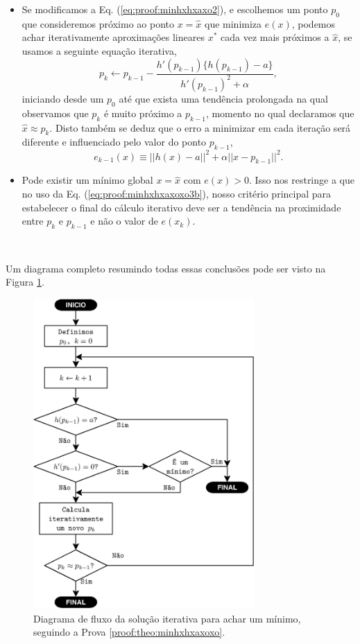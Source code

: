 \begin{myproofT}
\begin{itemize}
\item Se modificamos a Eq. (\ref{eq:proof:minhxhxaxo2}), e escolhemos um ponto  
$p_0$ que consideremos próximo ao ponto $x=\hat{x}$ que minimiza $e(x)$,
podemos achar iterativamente aproximações lineares $x^*$ cada vez mais próximos a  $\hat{x}$,
se usamos a seguinte equação iterativa,
\begin{equation}\label{eq:proof:minhxhxaxoxo3b}
p_{k} \leftarrow p_{k-1} - \frac{h'(p_{k-1})\{h(p_{k-1})-a\}}{h'(p_{k-1})^2 +\alpha},
\end{equation}
iniciando desde um $p_{0}$ 
até que exista uma tendência prolongada na qual observamos que $p_{k}$ é muito próximo a $p_{k-1}$,
momento no qual declaramos que $\hat{x} \approx p_{k}$.
Disto também se deduz que o erro a minimizar em cada iteração será diferente e influenciado pelo valor do ponto $p_{k-1}$,
\begin{equation}
e_{k-1}(x)  \equiv ||h(x)-a||^2+\alpha||x-p_{k-1}||^2.
\end{equation}
\item Pode existir um mínimo global $x=\hat{x}$ com $e(x) > 0$.
Isso nos restringe a que no uso da Eq. (\ref{eq:proof:minhxhxaxoxo3b}),
nosso critério principal para estabelecer o final do cálculo iterativo
deve ser a tendência na  proximidade entre $p_{k}$ e $p_{k-1}$ 
e não o valor de $e(x_k)$.
\end{itemize}~

Um diagrama completo resumindo todas essas conclusões pode ser visto na Figura \ref{fig:fluxohx3}.
\end{myproofT}
\begin{figure}[!h]
     \centering
         \includegraphics[width=0.75\textwidth]{chapters/minimization-hx/fluxo3.eps}
        \caption{Diagrama de fluxo da solução iterativa para achar um mínimo, seguindo a Prova \ref{proof:theo:minhxhxaxoxo}.}
        \label{fig:fluxohx3}
\end{figure}

